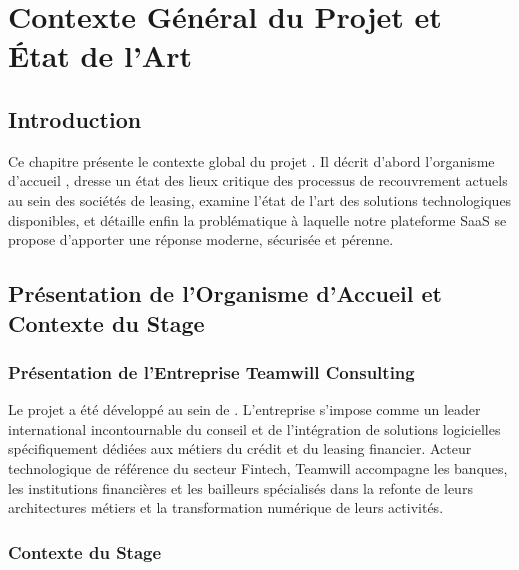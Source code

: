 
\chapter{Contexte Général du Projet et État de l'Art}
\label{chap:contexte}

\section{Introduction}

Ce chapitre présente le contexte global du projet \textbf{\projectShortTitle}. Il décrit d'abord l'organisme d'accueil \textbf{\hostCompany}, dresse un état des lieux critique des processus de recouvrement actuels au sein des sociétés de leasing, examine l'état de l'art des solutions technologiques disponibles, et détaille enfin la problématique à laquelle notre plateforme SaaS se propose d'apporter une réponse moderne, sécurisée et pérenne.

\section{Présentation de l'Organisme d'Accueil et Contexte du Stage}

\subsection{Présentation de l'Entreprise Teamwill Consulting}

Le projet a été développé au sein de \textbf{\hostCompany}. L'entreprise s'impose comme un leader international incontournable du conseil et de l'intégration de solutions logicielles spécifiquement dédiées aux métiers du crédit et du leasing financier. Acteur technologique de référence du secteur Fintech, Teamwill accompagne les banques, les institutions financières et les bailleurs spécialisés dans la refonte de leurs architectures métiers et la transformation numérique de leurs activités.

\subsection{Contexte du Stage}


